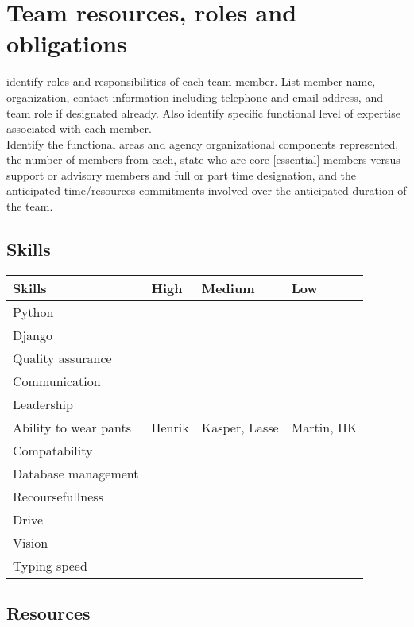 \section{Team resources, roles and obligations} identify roles and
responsibilities of each team member. List member name, organization,
contact information including telephone and email address, and team role
if designated already. Also identify specific functional level of expertise
associated with each member.\\ Identify the functional areas and agency
organizational components represented, the number of members from each, state
who are core [essential] members versus support or advisory members and full or
part time designation, and the anticipated time/resources commitments involved
over the anticipated duration of the team.

\subsection{Skills}
\begin{table}
    \centering
    \begin{tabular}{l|l|l|l}
        \rowcolor{Gray}
        \textbf{Skills} & \textbf{High} & \textbf{Medium} & \textbf{Low}\\\hline
        Python & & &\\
        Django & & &\\
        Quality assurance & & &\\
        Communication & & &\\
        Leadership & & &\\
        Ability to wear pants & Henrik & Kasper, Lasse & Martin, HK\\
        Compatability & & &\\
        Database management & & &\\
        Recoursefullness & & &\\
        Drive & & &\\
        Vision & & &\\
        Typing speed & & &\\
    \end{tabular}
    \label{tab:Skillz}
\end{table}

\subsection{Resources}

